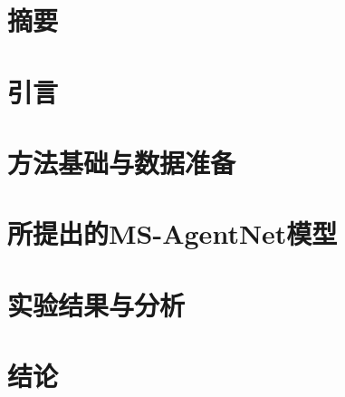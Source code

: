 \documentclass[UTF8,11pt]{ctexart}
\begin{document}
\section*{摘要}

\section{引言}


\FloatBarrier
\section{方法基础与数据准备}

\FloatBarrier
\section{所提出的MS-AgentNet模型}

\FloatBarrier
\section{实验结果与分析}

\FloatBarrier
\section{结论}

\FloatBarrier

\end{document}
